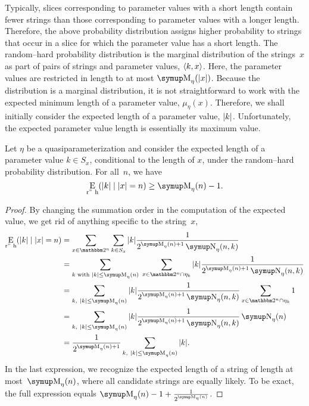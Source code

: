 Typically, slices corresponding to parameter values with a short length contain fewer strings than those corresponding to parameter values with a longer length.
Therefore, the above probability distribution assigns higher probability to strings that occur in a slice for which the parameter value has a short length.
The random--hard probability distribution is the marginal distribution of the strings~$x$ as part of pairs of strings and parameter values, ${\langle k, x\rangle}$.
Here, the parameter values are restricted in length to at most $\upM_\eta(\length{x})$.
Because the distribution is a marginal distribution, it is not straightforward to work with the expected minimum length of a parameter value, $\mu_\eta(x)$.
Therefore, we shall initially consider the expected length of a parameter value, ${\lvert k\rvert}$.
Unfortunately, the expected parameter value length is essentially its maximum value.
\begin{theorem}
\label{thm:expected_randomhard}%
  Let $\eta$ be a quasiparameterization and consider the expected length of a parameter value $k \in S_x$, conditional to the length of $x$, under the random--hard probability distribution.
  For all~$n$, we have
  \begin{equation*}
    \Ex_\mathrm{r"~h}(\length{k} \given \length{x} = n) \ge \upM_\eta(n) - 1.
  \end{equation*}
\end{theorem}
\begin{proof}
  By changing the summation order in the computation of the expected value, we get rid of anything specific to the string~$x$,
  \begin{align*}
    \Ex_\mathrm{r"~h}(\length{k} \given \length{x} = n)
      &= \sum_{x \in \binary^n} \sum_{k \in S_x} \length{k} \frac{1}{2^{\upM_\eta(n) + 1} \upN_\eta(n, k)} \\
      &= \sum_{k\text{ with }\length{k} \le \upM_\eta(n)}\;\sum_{x \in \binary^n \cap \eta_k} \length{k} \frac{1}{2^{\upM_\eta(n) + 1} \upN_\eta(n, k)} \\
      &= \sum_{k,\ \length{k} \le \upM_\eta(n)} \length{k} \frac{1}{2^{\upM_\eta(n) + 1} \upN_\eta(n, k)} \sum_{x \in \binary^n \cap \eta_k} 1 \\
      &= \sum_{k,\ \length{k} \le \upM_\eta(n)} \length{k} \frac{1}{2^{\upM_\eta(n) + 1} \upN_\eta(n, k)} \upN_\eta(n) \\
      &= \frac{1}{2^{\upM_\eta(n) + 1}} \sum_{k,\ \length{k} \le \upM_\eta(n)} \length{k}.
  \end{align*}
  In the last expression, we recognize the expected length of a string of length at most~$\upM_\eta(n)$, where all candidate strings are equally likely.
  To be exact, the full expression equals $\upM_\eta(n) - 1 + \frac{1}{2^{\upM_\eta(n)}}$.
\end{proof}

